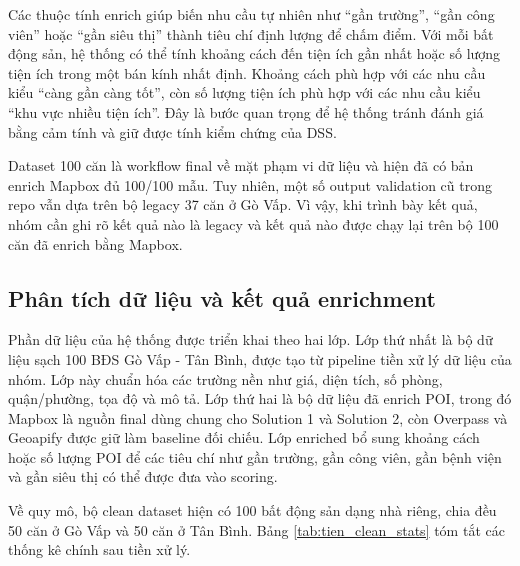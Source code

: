 \documentclass[a4paper,12pt]{article}
\begin{document}
Các thuộc tính enrich giúp biến nhu cầu tự nhiên như ``gần trường'', ``gần công viên'' hoặc ``gần siêu thị'' thành tiêu chí định lượng để chấm điểm. Với mỗi bất động sản, hệ thống có thể tính khoảng cách đến tiện ích gần nhất hoặc số lượng tiện ích trong một bán kính nhất định. Khoảng cách phù hợp với các nhu cầu kiểu ``càng gần càng tốt'', còn số lượng tiện ích phù hợp với các nhu cầu kiểu ``khu vực nhiều tiện ích''. Đây là bước quan trọng để hệ thống tránh đánh giá bằng cảm tính và giữ được tính kiểm chứng của DSS.

\begin{tcolorbox}[colback=notebg,colframe=noteframe,title=Ghi chú về trạng thái dữ liệu]
Dataset 100 căn là workflow final về mặt phạm vi dữ liệu và hiện đã có bản enrich Mapbox đủ 100/100 mẫu. Tuy nhiên, một số output validation cũ trong repo vẫn dựa trên bộ legacy 37 căn ở Gò Vấp. Vì vậy, khi trình bày kết quả, nhóm cần ghi rõ kết quả nào là legacy và kết quả nào được chạy lại trên bộ 100 căn đã enrich bằng Mapbox.
\end{tcolorbox}

\subsection{Phân tích dữ liệu và kết quả enrichment}
Phần dữ liệu của hệ thống được triển khai theo hai lớp. Lớp thứ nhất là bộ dữ liệu sạch 100 BĐS Gò Vấp - Tân Bình, được tạo từ pipeline tiền xử lý dữ liệu của nhóm. Lớp này chuẩn hóa các trường nền như giá, diện tích, số phòng, quận/phường, tọa độ và mô tả. Lớp thứ hai là bộ dữ liệu đã enrich POI, trong đó Mapbox là nguồn final dùng chung cho Solution 1 và Solution 2, còn Overpass và Geoapify được giữ làm baseline đối chiếu. Lớp enriched bổ sung khoảng cách hoặc số lượng POI để các tiêu chí như gần trường, gần công viên, gần bệnh viện và gần siêu thị có thể được đưa vào scoring.

Về quy mô, bộ clean dataset hiện có 100 bất động sản dạng nhà riêng, chia đều 50 căn ở Gò Vấp và 50 căn ở Tân Bình. Bảng \ref{tab:tien_clean_stats} tóm tắt các thống kê chính sau tiền xử lý.
\end{document}
